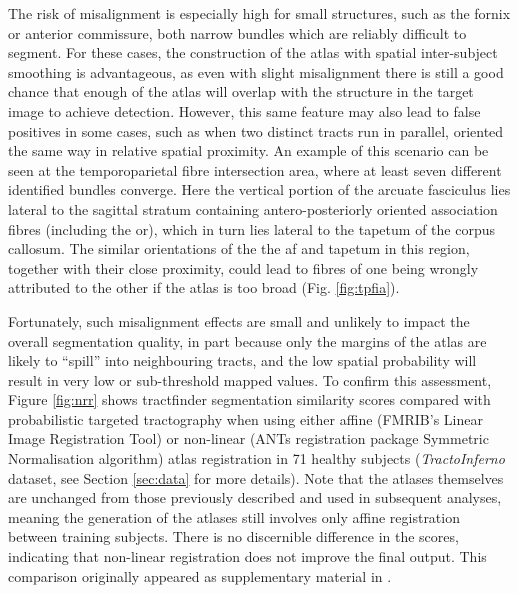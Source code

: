 \documentclass[12pt,phd,a4paper,twoside]{ucl_thesis}
\renewcommand{\textcite}[2][]{
\ifthenelse { \equal {#1} {} }  {\citeauthor{#2}\autocite{#2}}   {\citeauthor{#1}\autocite{#2}}}
\providecommand{\DIFdeltex}[1]{{\protect\color{red} \scriptsize #1}} %
\providecommand{\DIFdelbegin}{} %
\providecommand{\DIFdelend}{} %
\providecommand{\DIFdel}[1]{\texorpdfstring{\DIFdeltex{#1}}{}} %
\newcommand{\DIFscaledelfig}{0.5}
\newlength{\DIFdelgraphicswidth} %
\newlength{\DIFdelgraphicsheight} %
\newcommand{\DIFdelincludegraphics}[2][]{%
\sbox{\DIFdelgraphicsbox}{\DIFOincludegraphics[#1]{#2}}%
\settoboxwidth{\DIFdelgraphicswidth}{\DIFdelgraphicsbox} %
\settoboxtotalheight{\DIFdelgraphicsheight}{\DIFdelgraphicsbox} %
\scalebox{\DIFscaledelfig}{%
\parbox[b]{\DIFdelgraphicswidth}{\usebox{\DIFdelgraphicsbox}\\[-\baselineskip] \rule{\DIFdelgraphicswidth}{0em}}\llap{\resizebox{\DIFdelgraphicswidth}{\DIFdelgraphicsheight}{%
\setlength{\unitlength}{\DIFdelgraphicswidth}%
\begin{picture}(1,1)%
\thicklines\linethickness{2pt} %
{\color[rgb]{1,0,0}\put(0,0){\framebox(1,1){}}}%
{\color[rgb]{1,0,0}\put(0,0){\line( 1,1){1}}}%
{\color[rgb]{1,0,0}\put(0,1){\line(1,-1){1}}}%
\end{picture}%
}\hspace*{3pt}}} %
} %
\DeclareRobustCommand{\DIFdelbegin}{\DIFOdelbegin \let\includegraphics\DIFdelincludegraphics} %
\DeclareRobustCommand{\DIFdelend}{\DIFOaddend \let\includegraphics\DIFOincludegraphics} %
\begin{document}
The risk of misalignment is especially high for small structures, such as the fornix or anterior commissure, both narrow bundles which are reliably difficult to segment.
For these cases, the construction of the atlas with spatial inter-subject smoothing is advantageous, as even with slight misalignment there is still a good chance that enough of the atlas will overlap with the structure in the target image to achieve detection.
However, this same feature may also lead to false positives in some cases, such as when two distinct tracts run in parallel, oriented the same way in relative spatial proximity.
An example of this scenario can be seen at the temporoparietal fibre intersection area, where at least seven different identified bundles converge\autocite{Martino2013}.
Here the vertical portion of the arcuate fasciculus lies lateral to the sagittal stratum containing antero-posteriorly oriented association fibres (including the \gls{or}), which in turn lies lateral to the tapetum of the corpus callosum.
The similar orientations of the \DIFdelbegin \DIFdel{the }\DIFdelend \gls{af} and tapetum in this region, together with their close proximity, could lead to fibres of one being wrongly attributed to the other if the atlas is too broad (Fig. \ref{fig:tpfia}).

\begin{SCfigure}[][h!]
  
  \caption[Atlas misalignment with linear registration]{Example of potential for atlas misalignment. The  (A) and tapetum (T) are proximal and parallel at the temporoparietal fibre intersection area. Linearly registered right  atlas  may overlap with the tapetum (arrowhead).}
  \label{fig:tpfia}
\end{SCfigure}

Fortunately, such misalignment effects are small and unlikely to impact the overall segmentation quality, in part because only the margins of the atlas are likely to ``spill'' into neighbouring tracts, and the low spatial probability will result in very low or sub-threshold mapped values.
To confirm this assessment, Figure \ref{fig:nrr} shows tractfinder segmentation similarity scores compared with probabilistic targeted tractography when using either affine (FMRIB's Linear Image Registration Tool\autocite{Jenkinson2002}) or non-linear (ANTs registration package Symmetric Normalisation algorithm\autocite{Tustison2013,Avants2011}) atlas registration in 71 healthy subjects (\textit{TractoInferno} dataset, see Section \ref{sec:data} for more details).
Note that the atlases themselves are unchanged from those previously described and used in subsequent analyses, meaning the generation of the atlases still involves only affine registration between training subjects.
There is no discernible difference in the scores, indicating that non-linear registration does not improve the final output.
This comparison originally appeared as supplementary material in \textcite{Young2024}.
\end{document}
